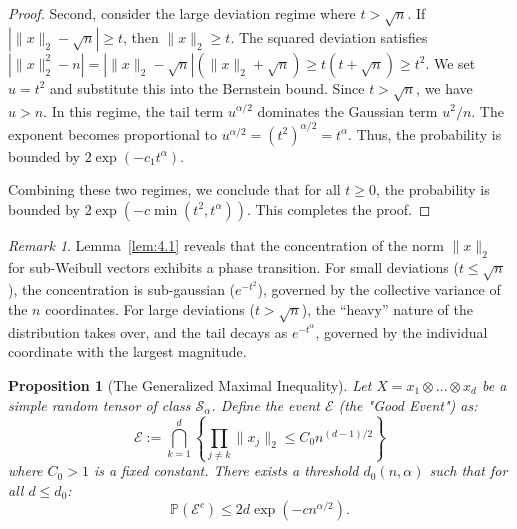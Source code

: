 \documentclass[11pt]{amsart}
\newtheorem{proposition}[theorem]{Proposition}
\theoremstyle{definition}
\theoremstyle{remark}
\newtheorem*{remark}{Remark}
\begin{document}
\begin{proof}
Second, consider the large deviation regime where $t > \sqrt{n}$. If $| \|x\|_2 - \sqrt{n} | \geq t$, then $\|x\|_2 \geq t$. The squared deviation satisfies $| \|x\|_2^2 - n | = | \|x\|_2 - \sqrt{n} | ( \|x\|_2 + \sqrt{n} ) \geq t (t + \sqrt{n}) \geq t^2$. We set $u = t^2$ and substitute this into the Bernstein bound. Since $t > \sqrt{n}$, we have $u > n$. In this regime, the tail term $u^{\alpha/2}$ dominates the Gaussian term $u^2/n$. The exponent becomes proportional to $u^{\alpha/2} = (t^2)^{\alpha/2} = t^\alpha$. Thus, the probability is bounded by $2 \exp( -c_1 t^\alpha )$.

Combining these two regimes, we conclude that for all $t \geq 0$, the probability is bounded by $2 \exp( -c \min( t^2, t^\alpha ) )$. This completes the proof.
\end{proof}

\begin{remark}
Lemma~\ref{lem:4.1} reveals that the concentration of the norm $\|x\|_2$ for sub-Weibull vectors exhibits a phase transition. For small deviations ($t \le \sqrt{n}$), the concentration is sub-gaussian ($e^{-t^2}$), governed by the collective variance of the $n$ coordinates. For large deviations ($t > \sqrt{n}$), the ``heavy'' nature of the distribution takes over, and the tail decays as $e^{-t^\alpha}$, governed by the individual coordinate with the largest magnitude.
\end{remark}

\begin{proposition}[The Generalized Maximal Inequality]\label{prop:4.2}
Let $X = x_1 \otimes \dots \otimes x_d$ be a simple random tensor of class $\mathcal{S}_{\alpha}$. Define the event $\mathcal{E}$ (the "Good Event") as:
\begin{equation}
\mathcal{E} := \bigcap_{k=1}^d \left\{ \prod_{j \neq k} \|x_j\|_2 \le C_0 n^{(d-1)/2} \right\}
\end{equation}
where $C_0 > 1$ is a fixed constant. There exists a threshold $d_0(n, \alpha)$ such that for all $d \le d_0$:
\begin{equation}
\mathbb{P}(\mathcal{E}^c) \le 2d \exp(-c n^{\alpha/2}).
\end{equation}
\end{proposition}
\end{document}
